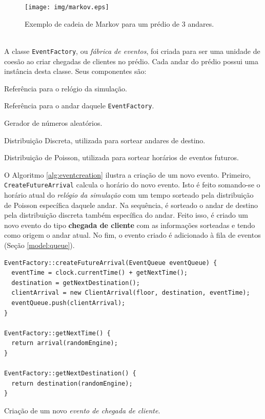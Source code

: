 \begin{description}
\begin{figure}[htb!]
  \centering
  \texttt{[image: img/markov.eps]}
  \caption{Exemplo de cadeia de Markov para um prédio de 3 andares.}
\label{fig:distribution:markov}
\end{figure}

\item[EventFactory] \label{model:eventfactory} \hfill \\
A classe \texttt{EventFactory}, ou \textit{fábrica de eventos}, foi criada para
ser uma unidade de coesão ao criar chegadas de clientes no prédio. Cada andar do
prédio possui uma instância desta classe. Seus componentes são:

  \begin{description}[leftmargin=!,labelwidth=\widthof{\bfseries hasNextEvent}]
    \item[\texttt{clock}] Referência para o relógio da simulação.
    \item[\texttt{floor}] Referência para o andar daquele \texttt{EventFactory}.
    \item[\texttt{random engine}] Gerador de números aleatórios.
    \item[\texttt{destination}] Distribuição Discreta, utilizada para sortear andares de destino.
    \item[\texttt{arrival}] Distribuição de Poisson, utilizada para sortear horários de eventos futuros.
  \end{description}

  O Algoritmo \ref{alg:eventcreation} ilustra a criação de um novo evento.
  Primeiro, \texttt{CreateFutureArrival} calcula o horário do novo evento. Isto
  é feito somando-se o horário atual do \textit{relógio da simulação} com um
  tempo sorteado pela distribuição de Poisson específica daquele andar. Na
  sequência, é sorteado o andar de destino pela distribuição discreta também
  específica do andar. Feito isso, é criado um novo evento do tipo
  \textbf{chegada de cliente} com as informações sorteadas e tendo como origem o
  andar atual. No fim, o evento criado é adicionado à fila de eventos (Seção
  \ref{model:queue}).
    \begin{algorithm}[htb!]
      \centering
        \begin{verbatim}
EventFactory::createFutureArrival(EventQueue eventQueue) {
  eventTime = clock.currentTime() + getNextTime();
  destination = getNextDestination();
  clientArrival = new ClientArrival(floor, destination, eventTime);
  eventQueue.push(clientArrival);
}

EventFactory::getNextTime() {
  return arrival(randomEngine);
}

EventFactory::getNextDestination() {
  return destination(randomEngine);
}
        \end{verbatim}
      \caption{\label{alg:eventcreation}Criação de um novo \textit{evento de chegada de cliente}.}
    \end{algorithm}
\end{description}

